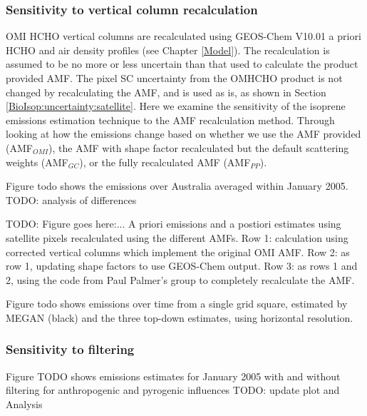     
    \subsubsection{Sensitivity to vertical column recalculation}
      \label{BioIsop:uncertainty:satellite:AMF}
      OMI HCHO vertical columns are recalculated using GEOS-Chem V10.01 a priori HCHO and air density profiles (see Chapter \ref{Model}).
      The recalculation is assumed to be no more or less uncertain than that used to calculate the product provided AMF.
      The pixel SC uncertainty from the OMHCHO product is not changed by recalculating the AMF, and is used as is, as shown in Section \ref{BioIsop:uncertainty:satellite}.
      Here we examine the sensitivity of the isoprene emissions estimation technique to the AMF recalculation method.
      Through looking at how the emissions change based on whether we use the AMF provided (AMF$_{OMI}$), the AMF with shape factor recalculated but the default scattering weights (AMF$_{GC}$), or the fully recalculated AMF (AMF$_{PP}$).
      
      Figure todo shows the emissions over Australia averaged within January 2005.
      TODO: analysis of differences
      
      
      TODO: Figure goes here:... 
      A priori emissions and a postiori estimates using satellite pixels recalculated using the different AMFs.
      Row 1: calculation using corrected vertical columns which implement the original OMI AMF.
      Row 2: as row 1, updating shape factors to use GEOS-Chem output.
      Row 3: as rows 1 and 2, using the code from Paul Palmer's group to completely recalculate the AMF.
      
      
      Figure todo shows emissions over time from a single grid square, estimated by MEGAN (black) and the three top-down estimates, using \lowhr horizontal resolution.
  
    \subsubsection{Sensitivity to filtering}
    \label{BioIsop:uncertainty:satellite:fire_filter}
    
    Figure TODO shows emissions estimates for January 2005 with and without filtering for anthropogenic and pyrogenic influences
    TODO: update plot and Analysis
    
    
